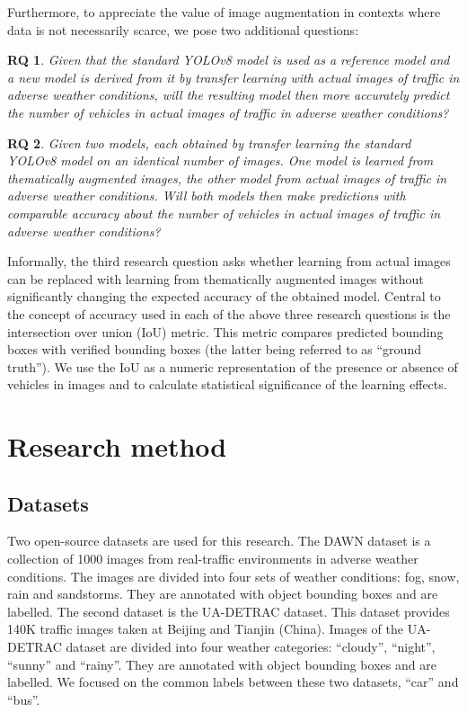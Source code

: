 \documentclass[]{article}
\newtheorem{researchquestion}{RQ}
\begin{document}
	Furthermore, to appreciate the value of image augmentation in contexts where data is not necessarily scarce, we pose two additional questions:
	\begin{researchquestion}
	\label{rq2}
	Given that the standard YOLOv8 model is used as a reference model and a new model is derived from it by transfer learning with actual images of traffic in adverse weather conditions, will the resulting model then more accurately predict the number of vehicles in actual images of traffic in adverse weather conditions?
	\end{researchquestion}

	\begin{researchquestion}
	\label{rq3}
	Given two models, each obtained by transfer learning the standard YOLOv8 model on an identical number of images. One model is learned from thematically
	augmented images, the other model from actual images of traffic in adverse weather conditions. Will both models then make predictions with comparable accuracy about the number of vehicles in actual images of traffic in adverse weather conditions?
	\end{researchquestion}

	Informally, the third research question asks whether learning from actual images can be replaced with learning from thematically augmented images without significantly changing the expected accuracy of the obtained model. Central to the concept of accuracy used in each of the above three research questions is the intersection over union (IoU) metric. This metric compares predicted bounding boxes with verified bounding boxes (the latter being referred to as “ground truth”). We use the IoU as a numeric representation of the presence or absence of vehicles in images and to calculate
	statistical significance of the learning effects.	

\section{Research method}

\subsection{Datasets}

	Two open-source datasets are used for this research. The DAWN dataset \cite{bw1x-yh39-20} is a collection of 1000 images from real-traffic environments in adverse weather conditions. The images are divided into four sets of weather conditions: fog, snow, rain and sandstorms. They are annotated with object bounding boxes and are labelled.  The second dataset is the UA-DETRAC \cite{CVIU_UA-DETRAC} dataset. This dataset provides 140K traffic images taken at Beijing and Tianjin (China). Images of the UA-DETRAC dataset are divided into four weather categories: ``cloudy'', ``night'', ``sunny'' and ``rainy''. They are annotated with object bounding boxes and are labelled.  We focused on the common labels between these two datasets, ``car'' and ``bus''.
\end{document}
